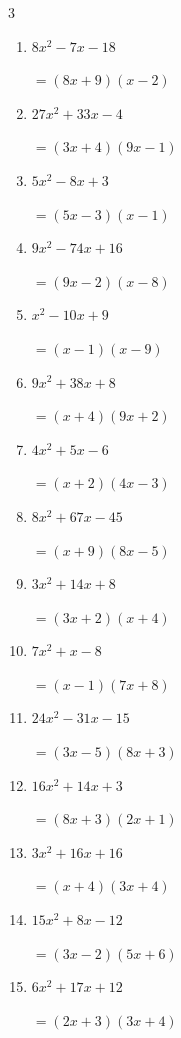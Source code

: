 \begin{multicols}{3}
\begin{enumerate}
        $=(5x+6)(3x+7)$

  \item $8x^{2}-7x-18$

        $=(8x+9)(x-2)$

  \item $27x^{2}+33x-4$

        $=(3x+4)(9x-1)$

  \item $5x^{2}-8x+3$

        $=(5x-3)(x-1)$

  \item $9x^{2}-74x+16$

        $=(9x-2)(x-8)$

  \item $x^{2}-10x+9$

        $=(x-1)(x-9)$

\columnbreak %

  \item $9x^{2}+38x+8$

        $=(x+4)(9x+2)$

  \item $4x^{2}+5x-6$

        $=(x+2)(4x-3)$

  \item $8x^{2}+67x-45$

        $=(x+9)(8x-5)$

  \item $3x^{2}+14x+8$

        $=(3x+2)(x+4)$

  \item $7x^{2}+x-8$

        $=(x-1)(7x+8)$

  \item $24x^{2}-31x-15$

        $=(3x-5)(8x+3)$

  \item $16x^{2}+14x+3$

        $=(8x+3)(2x+1)$

  \item $3x^{2}+16x+16$

        $=(x+4)(3x+4)$

  \item $15x^{2}+8x-12$

        $=(3x-2)(5x+6)$

  \item $6x^{2}+17x+12$

        $=(2x+3)(3x+4)$


\end{enumerate}
\end{multicols}
